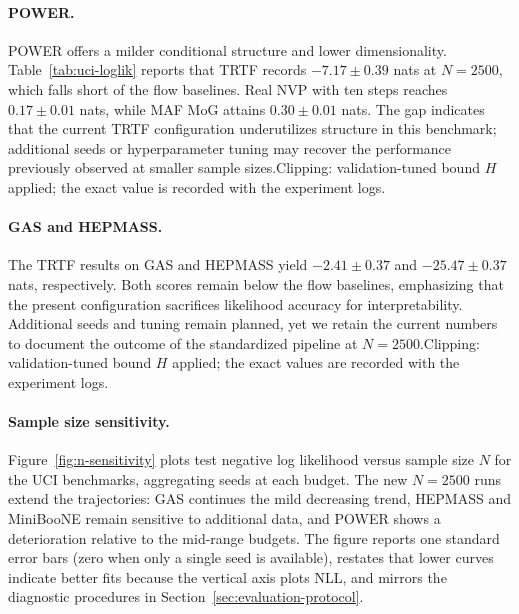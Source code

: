 \documentclass[11pt,a4paper,twoside]{book}\usepackage[]{graphicx}\usepackage[]{xcolor}
\begin{document}
\paragraph{POWER.} POWER offers a milder conditional structure and lower dimensionality. Table~\ref{tab:uci-loglik} reports that TRTF records $-7.17 \pm 0.39$ nats at $N=2500$, which falls short of the flow baselines. Real NVP with ten steps reaches $0.17 \pm 0.01$ nats, while MAF MoG attains $0.30 \pm 0.01$ nats. The gap indicates that the current TRTF configuration underutilizes structure in this benchmark; additional seeds or hyperparameter tuning may recover the performance previously observed at smaller sample sizes.\;Clipping: validation-tuned bound $H$ applied; the exact value is recorded with the experiment logs.

\paragraph{GAS and HEPMASS.} The TRTF results on GAS and HEPMASS yield $-2.41 \pm 0.37$ and $-25.47 \pm 0.37$ nats, respectively. Both scores remain below the flow baselines, emphasizing that the present configuration sacrifices likelihood accuracy for interpretability. Additional seeds and tuning remain planned, yet we retain the current numbers to document the outcome of the standardized pipeline at $N=2500$.\;Clipping: validation-tuned bound $H$ applied; the exact values are recorded with the experiment logs.

\paragraph{Sample size sensitivity.} Figure~\ref{fig:n-sensitivity} plots test negative log likelihood versus sample size $N$ for the UCI benchmarks, aggregating seeds at each budget. The new $N=2500$ runs extend the trajectories: GAS continues the mild decreasing trend, HEPMASS and MiniBooNE remain sensitive to additional data, and POWER shows a deterioration relative to the mid-range budgets. The figure reports one standard error bars (zero when only a single seed is available), restates that lower curves indicate better fits because the vertical axis plots NLL, and mirrors the diagnostic procedures in Section~\ref{sec:evaluation-protocol}.
\end{document}
